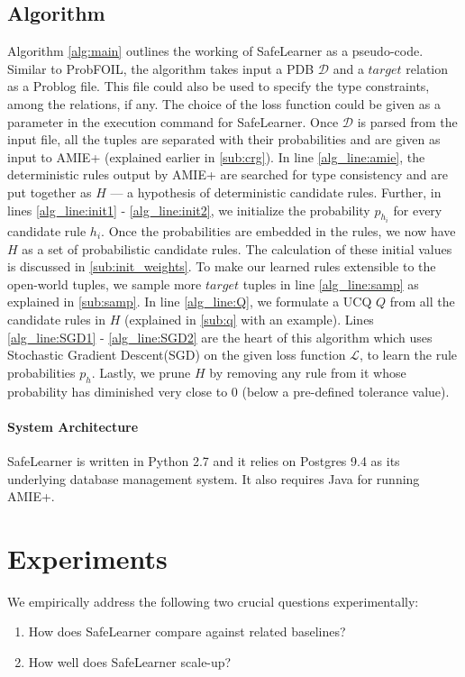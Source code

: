 \documentclass[akbc,twoside,11pt]{article}
\newcounter{example}
\newcommand{\algorithmname}{SafeLearner\xspace}
\begin{document}
\subsection{Algorithm} Algorithm \ref{alg:main} outlines the working of \algorithmname as a pseudo-code. Similar to ProbFOIL, the algorithm takes input a PDB $\mathcal{D}$ and a $target$ relation as a Problog file. This file could also be used to specify the type constraints, among the relations, if any. The choice of the loss function could be given as a parameter in the execution command for \algorithmname. Once $\mathcal{D}$ is parsed from the input file, all the tuples are separated with their probabilities and are given as input to AMIE+ (explained earlier in \ref{sub:crg}). In line \ref{alg_line:amie}, the deterministic rules output by AMIE+ are searched for type consistency and are put together as $H$ --- a hypothesis of deterministic candidate rules. Further, in lines \ref{alg_line:init1} - \ref{alg_line:init2}, we initialize the probability $p_{h_i}$ for every candidate rule $h_i$. Once the probabilities are embedded in the rules, we now have $H$ as a set of probabilistic candidate rules. The calculation of these initial values is discussed in \ref{sub:init_weights}.%
To make our learned rules extensible to the open-world tuples, we sample more $target$ tuples in line \ref{alg_line:samp} as explained in \ref{sub:samp}. In line \ref{alg_line:Q}, we formulate a UCQ $Q$ from all the candidate rules in $H$ (explained in \ref{sub:q} with an example). Lines \ref{alg_line:SGD1} - \ref{alg_line:SGD2} are the heart of this algorithm which uses Stochastic Gradient Descent(SGD) on the given loss function $\mathcal{L}$, to learn the rule probabilities $p_h$. Lastly, we prune $H$ by removing any rule from it whose probability has diminished very close to 0 (below a pre-defined tolerance value).


\paragraph{System Architecture}
\algorithmname is written in Python 2.7 and it relies on Postgres 9.4 as its underlying database management system. It also requires Java for running AMIE+.


\section{Experiments}
\label{sec:exp}
We empirically address the following two crucial questions experimentally:
\begin{enumerate}
    \item How does \algorithmname compare against related baselines?
    \item How well does \algorithmname scale-up?
\end{enumerate}
\end{document}
